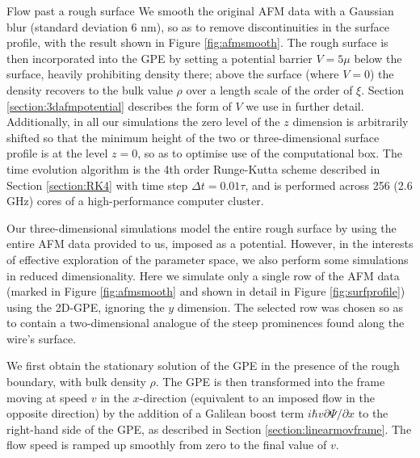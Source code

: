 \begin{chapter}{\label{cha:afm}Flow past a rough surface}
We smooth the original AFM data with a Gaussian blur (standard deviation 6 nm), so as to remove discontinuities in the surface profile, with the result shown in Figure \ref{fig:afmsmooth}. The rough surface is then incorporated into the GPE by setting a potential barrier $V=5\mu$ below the surface, heavily prohibiting density there; above the surface (where $V=0$) the density recovers to the bulk value $\rho$ over a length scale of the order of $\xi$. Section \ref{section:3dafmpotential} describes the form of $V$ we use in further detail. Additionally, in all our simulations the zero level of the $z$ dimension is arbitrarily shifted so that the minimum height of the two or three-dimensional surface profile is at the level $z=0$, so as to optimise use of the computational box. The time evolution algorithm is the 4th order Runge-Kutta scheme described in Section \ref{section:RK4} with time step $\Delta t=0.01 \tau $, and is performed across 256 (2.6 GHz) cores of a high-performance {computer} cluster.

Our three-dimensional simulations model the entire rough surface by using the entire AFM data provided to us, imposed as a potential. However, in the interests of effective exploration of the parameter space, we also perform some simulations in reduced dimensionality. Here we simulate only a single row of the AFM data (marked in Figure \ref{fig:afmsmooth} and shown in detail in Figure \ref{fig:surfprofile}) using the 2D-GPE, ignoring the $y$ dimension. The selected row was chosen so as to contain a two-dimensional analogue of the steep prominences found along the wire's surface.

We first obtain the stationary solution of the GPE in the presence of
the rough boundary, with bulk density $\rho$.  The GPE is then transformed into the frame moving at speed $v$ in the $x$-direction (equivalent to an imposed flow in the opposite direction) by the addition of a Galilean boost term $ i \hbar v \partial \Psi/\partial x$ to the right-hand side of the GPE, as described in Section \ref{section:linearmovframe}.  The flow speed is ramped up smoothly from zero to the final value of $v$.


\end{chapter}
